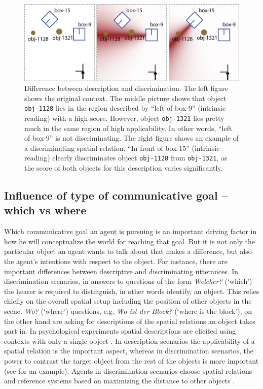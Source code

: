 \begin{figure}
\begin{centering}
\includegraphics[width=.8\columnwidth]{figs/description-vs-discrimination.png}
\end{centering}
\caption[Difference between discrimination and description]
{Difference between description and discrimination. The left figure
shows the original context. The middle picture shows that
object {\footnotesize\tt obj-1128} lies in the region described by ``left of box-9'' 
(intrinsic reading) with a high score. However, object {\footnotesize\tt obj-1321}
lies pretty much in the same region of high applicability. In other words,
``left of box-9'' is not discriminating. The right figure shows an example of
a discriminating spatial relation. ``In front of box-15'' (intrinsic reading) 
clearly discriminates object {\footnotesize\tt obj-1128} from {\footnotesize\tt obj-1321},
as the score of both objects for this description varies significantly.}
\label{f:discrimination-vs-description}
\end{figure}

\subsection{Influence of type of communicative goal -- which vs where}
Which communicative goal an agent is pursuing is an important 
driving factor in how he will conceptualize the world for reaching 
that goal. But it is not only the particular object an agent wants to talk 
about that makes a difference, but also the agent's intentions with 
respect to the object. For instance, there are important differences 
between descriptive and discriminating utterances. 
In discrimination scenarios, in answers to questions 
of the form \textit{Welcher?} (`which') the hearer is required to distinguish, in 
other words identify, an object. This relies chiefly on the overall 
spatial setup including the position of other objects 
in the scene. \textit{Wo?} (`where') questions, e.g. \textit{Wo ist der Block?} (`where is the block'),  
on the other hand are asking for descriptions of the spatial relations an object takes 
part in. In psychological experiments
spatial descriptions are elicited using contexts with only a 
single object \citep{levinson2003space}. 
In description scenarios the applicability
of a spatial relation is the important aspect, 
whereas in discrimination scenarios, the power to contrast the
target object from the rest of the objects is more important 
\citep{tenbrink2005identifying} 
(see  for an example). 
Agents in discrimination scenarios choose spatial relations and
reference systems based on maximizing the distance to other objects
\citep{herskovits1986language}.

